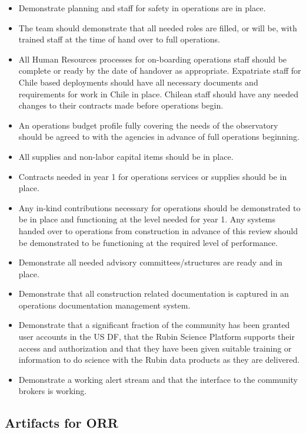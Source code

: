 \begin{itemize}

	\item Demonstrate planning and staff for safety in operations are in place. 
	\item The team should demonstrate that all needed roles are filled, or will be, with trained staff at the time of hand over to full operations.
	\item All Human Resources processes for on-boarding operations staff should be complete or ready by the date of handover as appropriate. Expatriate staff for Chile based deployments should have all necessary documents and requirements for work in Chile in place. Chilean staff should have any needed changes to their contracts made before operations begin. 
	\item An operations budget profile fully covering the needs of the observatory should be agreed to with the agencies in advance of full operations beginning.
	\item All supplies and non-labor capital items should be in place. 
	\item Contracts needed in year 1 for operations services or supplies should be in place. 
	\item Any in-kind contributions necessary for operations should be demonstrated to be in place and functioning at the level needed for year 1. Any systems handed over to operations from construction in advance of this review should be demonstrated to be functioning at the required level of performance.
	\item Demonstrate all needed advisory committees/structures are ready and in place.
	\item Demonstrate that all construction related documentation is captured in an operations documentation management system.
	\item Demonstrate that a significant fraction of the community has been granted user accounts in the US DF, that the Rubin Science Platform supports their access and authorization and that they have been given suitable training or information to do science with the Rubin data products as they are delivered.
	\item Demonstrate a working alert stream and that the interface to the community brokers is working. 

\end{itemize}

\subsection{Artifacts for ORR}

